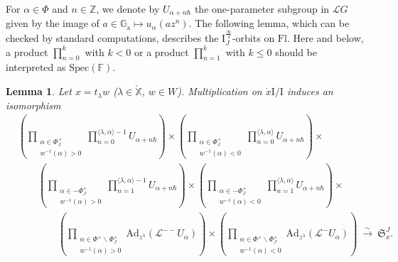 \documentclass[11pt]{amsart}
\numberwithin{equation}{section}
\theoremstyle{plain}
\newtheorem{lem}[thm]{Lemma}
\theoremstyle{definition}
\newcommand{\F}{{\mathbb F}}
\newcommand{\I}{{\mathrm I}}
\newcommand{\sL}{{\mathcal L}}
\newcommand{\X}{{\mathbb X}}
\newcommand{\Xd}{\check{\X}}
\newcommand{\Z}{{\mathbb Z}}
\newcommand{\xs}{{\ \xrightarrow{\sim}\ }}
\newcommand{\Spec}{\mathrm{Spec}}
\newcommand{\Ga}{{\mathbb{G}_{\mathrm{a}}}}
\newcommand{\Ad}{\mathrm{Ad}}
\newcommand{\quar}{{{\frac{\infty}{4}}}}
\newcommand{\Fl}{\mathrm{Fl}}
\newcommand{\rS}{\mathfrak{S}}
\begin{document}
For $\alpha\in \Phi$ and $n\in \Z$, we denote by $U_{\alpha+n\hbar}$ the one-parameter subgroup in $\sL G$ given by the image of $a\in\Ga \mapsto u_\alpha(az^n)$. The following lemma, which can be checked by standard computations, describes the $\I^\quar_J$-orbits on $\Fl$.
Here and below, a product $\prod_{n=0}^k$ with $k<0$ or a product $\prod_{n=1}^k$ with $k \leq 0$ should be interpreted as $\Spec(\F)$.

\begin{lem}
Let $x=t_\lambda w$ ($\lambda\in \Xd$, $w\in W$).
Multiplication on $\dot{x}\I/\I$ induces an isomorphism 
\begin{equation}
\label{eq:quar-orbit}
\begin{aligned}
&\left(\prod_{\substack{\alpha \in \Phi_J^+ \\ w^{-1}(\alpha)>0}} \prod_{n=0}^{\langle\lambda,\alpha\rangle-1}U_{\alpha+n\hbar} \right) \times 
\left(\prod_{\substack{\alpha \in \Phi_J^+ \\ w^{-1}(\alpha)<0}} \prod_{n=0}^{\langle\lambda,\alpha\rangle}U_{\alpha+n\hbar} \right) \times \\ 
&\qquad \left(\prod_{\substack{\alpha \in -\Phi_J^+ \\ w^{-1}(\alpha)>0}} \prod_{n=1}^{\langle\lambda,\alpha\rangle-1}U_{\alpha+n\hbar} \right) \times 
\left(\prod_{\substack{\alpha \in -\Phi_J^+ \\ w^{-1}(\alpha)<0}} \prod_{n=1}^{\langle\lambda,\alpha\rangle}U_{\alpha+n\hbar} \right) \times \\ 
&\qquad\qquad \left(\prod_{\substack{\alpha \in \Phi^+\smallsetminus \Phi_J^+ \\ w^{-1}(\alpha)>0}} \Ad_{z^{\lambda}}(\sL^{--} U_{\alpha}) \right) \times 
\left(\prod_{\substack{\alpha \in \Phi^+\smallsetminus \Phi_J^+ \\ w^{-1}(\alpha)<0}} \Ad_{z^{\lambda}}(\sL^{-} U_{\alpha}) \right) 
\xs \rS^{J}_{x}. 
\end{aligned}
\end{equation}
\end{lem}
\end{document}
